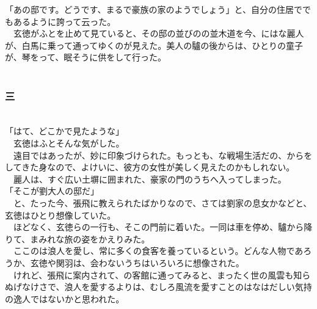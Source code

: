 \documentclass[
  paper=a5,
  fontsize=10pt,
  jafontsize=9.5pt,
  tate,                  %
  open_bracket_pos=nibu, %
]{jlreq}
\begin{document}
「あの邸です。どうです、まるで豪族の家のようでしょう」と、自分の住居ででもあるように誇って云った。\\


　玄徳がふとを止めて見ていると、その邸の並びのの並木道を今、にはな麗人が、白馬に乗って通ってゆくのが見えた。美人の驢の後からは、ひとりの童子が、琴をって、眠そうに供をして行った。\\

\\

\subsubsection{三}

\\


「はて、どこかで見たような」\\


　玄徳はふとそんな気がした。\\


　遠目ではあったが、妙に印象づけられた。もっとも、な戦場生活だの、からをしてきた身なので、よけいに、彼方の女性が美しく見えたのかもしれない。\\


　麗人は、すぐ広い土塀に囲まれた、豪家の門のうちへ入ってしまった。\\


「そこが劉大人の邸だ」\\


　と、たった今、張飛に教えられたばかりなので、さては劉家の息女かなどと、玄徳はひとり想像していた。\\


　ほどなく、玄徳らの一行も、そこの門前に着いた。一同は車を停め、驢から降りて、まみれな旅の姿をかえりみた。\\


　ここのは浪人を愛し、常に多くの食客を養っているという。どんな人物であろうか、玄徳や関羽は、会わないうちはいろいろに想像された。\\


　けれど、張飛に案内されて、の客館に通ってみると、まったく世の風雲も知らぬげなけさで、浪人を愛するよりは、むしろ風流を愛すことのはなはだしい気持の逸人ではないかと思われた。\\
\end{document}
